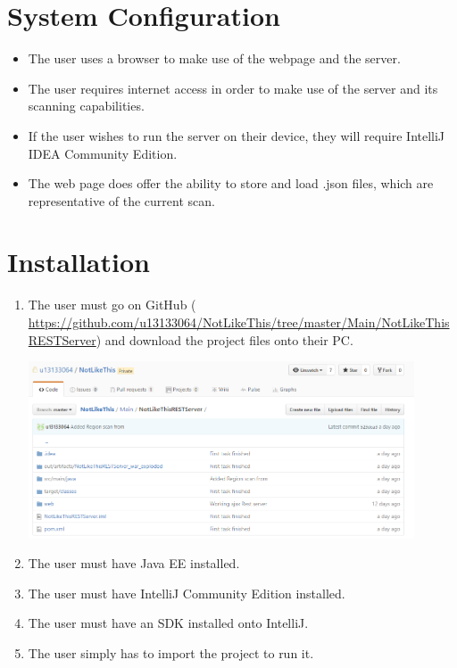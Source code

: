 \documentclass[hidelinks,a4paper,12pt]{article}
\begin{document}
\section{System Configuration}
\begin {itemize}
	\item The user uses a browser to make use of the webpage and the server.
	\item The user requires internet access in order to make use of the server and its scanning capabilities. 
	\item If the user wishes to run the server on their device, they will require IntelliJ IDEA Community Edition.
	\item The web page does offer the ability to store and load .json files, which are representative of the current scan.
\end{itemize}


\newpage

\section{Installation}
\begin {enumerate}
	\item The user must go on GitHub ( \url {https://github.com/u13133064/NotLikeThis/tree/master/Main/NotLikeThisRESTServer}) and download the project files onto their PC.
	\begin{center}
  		 \includegraphics[width=0.9\textwidth] {./images/Github.png}\\[0.4cm]
	\end{center}
	
	\item The user must have Java EE installed.
	\item The user must have IntelliJ Community Edition installed.
	\item The user must have an SDK installed onto IntelliJ.
	\item The user simply has to import the project to run it.
	
	
\end{enumerate}
\end{document}
